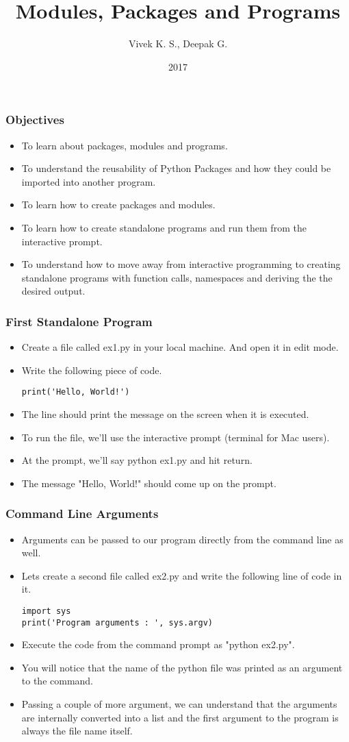 \documentclass{beamer}
\title{Modules, Packages and Programs}
\author{Vivek K. S., Deepak G.}
\institute{Information Systems Decision Sciences (ISDS)\\
MUMA College of Business\\
University of South Florida \\
Tampa, Florida}
\date{2017}
\begin{document}
\frame{\titlepage}

\begin{frame}
\frametitle{Objectives}
\begin{itemize}
\item To learn about packages, modules and programs.
\item To understand the reusability of Python Packages and how they could be imported  into another program.
\item To learn how to create packages and modules.
\item To learn how to create standalone programs and run them from the interactive prompt.
\item To understand how to move away from interactive programming to creating standalone programs with function calls, namespaces and deriving the the desired output.
\end{itemize}
\end{frame}


\begin{frame}[fragile]
\frametitle{First Standalone Program}
\begin{itemize}
\item Create a file called ex1.py in your local machine. And open it in edit mode.
\item Write the following piece of code.
\begin{lstlisting}
print('Hello, World!')
\end{lstlisting}
\item The line should print the message on the screen when it is executed.
\item To run the file, we'll use the interactive  prompt (terminal for Mac users).
\item At the prompt, we'll say python ex1.py and hit return.
\item The message "Hello, World!" should come up on the prompt.
\end{itemize}
\end{frame}

\begin{frame}[fragile]
\frametitle{Command Line Arguments}
\begin{itemize}
\item Arguments can be passed to our program directly from the command line as well.
\item Lets create a second file called ex2.py and write the following line of code in it.
\begin{lstlisting}
import sys
print('Program arguments : ', sys.argv)
\end{lstlisting}
\item Execute the code from the command prompt as "python ex2.py".
\item You will notice that the name of the python file was printed as an argument to the command.
\item Passing a couple of more argument, we can understand that the arguments are internally converted into a list and the first argument to the program is always the file name itself. 
\end{itemize}
\end{frame}
\end{document}
